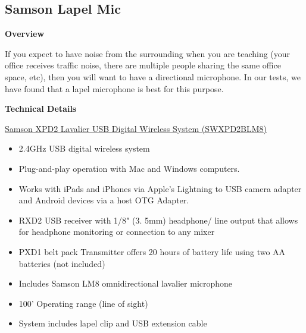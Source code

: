 \begin{gram}
\end{gram}

\begin{gram}
\end{gram}

\subsection{Samson Lapel Mic}
\label{sec:samsonlapel}

\begin{gram}
\label{grm:samsonlapel::main}

\textbf{Overview}

If you expect to have noise from the surrounding when you are teaching
(your office receives traffic noise, there are multiple people sharing
the same office space, etc), then you will want to have a
directional microphone.  
%
In our tests, we have found that a lapel microphone is best for this purpose.
%


\textbf{Technical Details}

\href{http://www.samsontech.com/samson/products/wireless-systems/xpd-series/xpd2lav/}
{Samson XPD2 Lavalier USB Digital Wireless System (SWXPD2BLM8)}

\begin{itemize}
\item 2.4GHz USB digital wireless system
\item Plug-and-play operation with Mac and Windows computers. 
\item Works with iPads and iPhones via Apple's Lightning to USB camera adapter and Android devices via a host OTG Adapter.

\item RXD2 USB receiver with 1/8" (3. 5mm) headphone/ line output that allows for headphone monitoring or connection to any mixer
\item PXD1 belt pack Transmitter offers 20 hours of battery life using two AA batteries (not included)
\item Includes Samson LM8 omnidirectional lavalier microphone
\item 100' Operating range (line of sight)
\item System includes lapel clip and USB extension cable
\end{itemize}


\end{gram}
